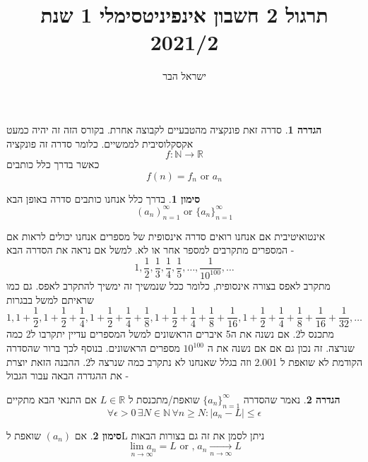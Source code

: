 \documentclass{article}
\begin{document}
\title{תרגול 2 חשבון אינפיניטסימלי 1 שנת 2021/2}
\author{ישראל הבר}
\maketitle

\newtheorem{theorem}{משפט}
\newtheorem{exercise}{תרגיל}
\newtheorem{homeexercise}{תרגיל לבית}
\newtheorem{solution}{Solution Of}
\theoremstyle{definition}
\newtheorem{definition}{הגדרה}
\newtheorem{notation}{סימון}
\newtheorem{claim}{טענה}
\renewcommand\qedsymbol{$\blacksquare$}

\begin{definition}
סדרה זאת פונקציה מהטבעיים לקבוצה אחרת. בקורס הזה זה יהיה כמעט אקסקלוסיבית לממשיים. כלומר סדרה זה פונקציה
\[f:\mathbb{N}\rightarrow\mathbb{R}\]
כאשר בדרך כלל כותבים
\[f(n)=f_n\text{ or } a_n\]
\end{definition}

\begin{notation}
בדרך כלל אנחנו כותבים סדרה באופן הבא 
\[\left( a_n\right)_{n=1}^{\infty} \text{ or } \{a_n\}_{n=1}^{\infty}\]
\end{notation}

אינטואיטיבית אם אנחנו רואים סדרה אינסופית של מספרים אנחנו יכולים לראות אם המספרים מתקרבים למספר אחר או לא. למשל אם נראה את הסדרה הבא - 
\[1, \frac{1}{2}, \frac{1}{3}, \frac{1}{4}, \frac{1}{5},\dots,\frac{1}{10^{100}},\dots\]
מתקרב לאפס בצורה אינסופית, כלומר ככל שנמשיך זה ימשיך להתקרב לאפס. גם כמו שראיתם למשל בבגרות 
\[1, 1+\frac{1}{2}, 1+\frac{1}{2} + \frac{1}{4}, 1+\frac{1}{2} + \frac{1}{4} + \frac{1}{8}, 1+\frac{1}{2} + \frac{1}{4} + \frac{1}{8} + \frac{1}{16},  1+\frac{1}{2} + \frac{1}{4} + \frac{1}{8} + \frac{1}{16} + \frac{1}{32}, \dots\]
מתכנס ל2. אם נשנה את ה5 איברים הראשונים למשל המספרים עדיין יתקרבו ל2 כמה שנרצה. זה נכון גם אם אם נשנה את ה
$10^{100}$
מספרים הראשונים. בנוסף לכך ברור שהסדרה הקודמת לא שואפת ל 2.001 וזה בגלל שאנחנו לא נתקרב כמה שנרצה ל2. ההבנה הזאת יוצרת את ההגדרה הבאה עבור הגבול - 

\begin{definition}
נאמר שהסדרה 
$\{a_n\}_{n=1}^{\infty}$
שואפת/מתכנסת ל 
$L\in\mathbb{R}$
אם התנאי הבא מתקיים 
\[\forall\epsilon>0\,\exists N\in\mathbb{N}\,\forall n\geq N: |a_n-L|\leq \epsilon\]
\end{definition}

\begin{notation}
אם 
$(a_n)$
שואפת לL ניתן לסמן את זה גם בצורות הבאות
\[\underset{n\rightarrow\infty}{\lim a_n} = L\text{ or ,}\; a_n\underset{n\rightarrow\infty}{\longrightarrow}L\]
\end{notation}
\end{document}

